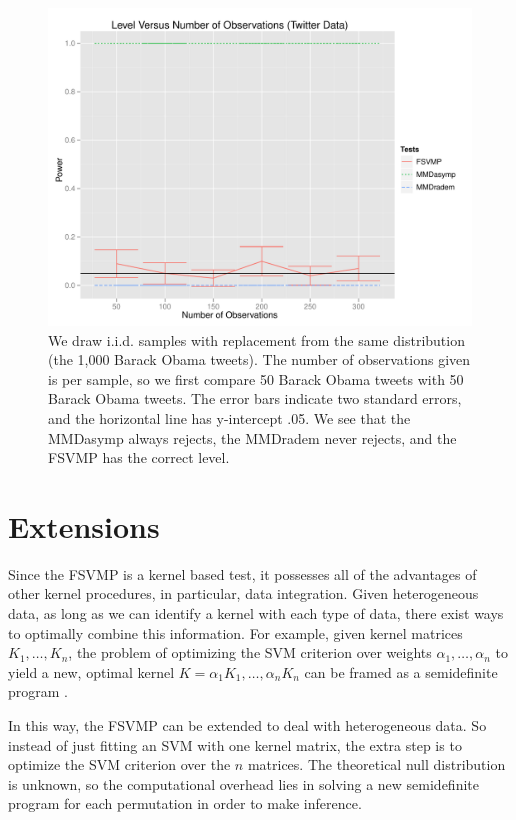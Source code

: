 \documentclass{article} %
\theoremstyle{remark}
\begin{document}
\begin{figure}[h!]
  \centering
  \includegraphics[width=.8\linewidth]{nips3.pdf}
  \caption{We draw i.i.d. samples with replacement from the same
    distribution (the 1,000 Barack Obama tweets).  The number of
    observations given is per sample, so we first compare 50 Barack
    Obama tweets with 50 Barack Obama tweets.  The error bars indicate
  two standard errors, and the horizontal line has y-intercept .05.
  We see that the MMDasymp always rejects, the MMDradem never rejects,
and the FSVMP has the correct level.}
\end{figure}

\section{Extensions}
Since the FSVMP is a kernel based test, it possesses all of the
advantages of other kernel procedures, in particular, data
integration.  Given heterogeneous data, as long as we can identify a
kernel with each type of data, there exist ways to optimally combine
this information.  For example, given kernel matrices $K_1,\ldots,
K_n$, the problem of optimizing the SVM criterion over weights
$\alpha_1,\ldots,\alpha_n$ to yield a new, optimal kernel
$K=\alpha_1K_1,\ldots,\alpha_nK_n$ can be framed as a semidefinite
program \cite{lanckriet2004learning}.  

In this way, the FSVMP can be extended to deal with heterogeneous
data.  So instead of just
fitting an SVM with one kernel matrix, the extra step is to optimize
the SVM criterion over the $n$ matrices.  The theoretical null distribution is unknown, so the
computational overhead lies in solving a new semidefinite program for
each permutation in order to make inference.  
\end{document}
